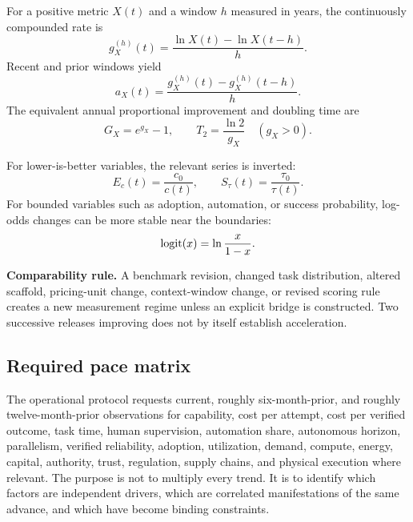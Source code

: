 For a positive metric $X(t)$ and a window $h$ measured in years, the continuously compounded rate is
\begin{equation}
\label{eq:growth}
g_X^{(h)}(t)=\frac{\ln X(t)-\ln X(t-h)}{h}.
\end{equation}
Recent and prior windows yield
\begin{equation}
\label{eq:acceleration}
a_X(t)=\frac{g_X^{(h)}(t)-g_X^{(h)}(t-h)}{h}.
\end{equation}
The equivalent annual proportional improvement and doubling time are
\begin{equation}
G_X=e^{g_X}-1,\qquad T_2=\frac{\ln 2}{g_X}\quad(g_X>0).
\end{equation}

For lower-is-better variables, the relevant series is inverted:
\begin{equation}
E_c(t)=\frac{c_0}{c(t)},\qquad S_\tau(t)=\frac{\tau_0}{\tau(t)}.
\end{equation}
For bounded variables such as adoption, automation, or success probability, log-odds changes can be more stable near the boundaries:
\begin{equation}
\operatorname{logit}(x)=\ln\frac{x}{1-x}.
\end{equation}

\begin{warningbox}
\textbf{Comparability rule.} A benchmark revision, changed task distribution, altered scaffold, pricing-unit change, context-window change, or revised scoring rule creates a new measurement regime unless an explicit bridge is constructed. Two successive releases improving does not by itself establish acceleration.
\end{warningbox}

\subsection{Required pace matrix}

The operational protocol requests current, roughly six-month-prior, and roughly twelve-month-prior observations for capability, cost per attempt, cost per verified outcome, task time, human supervision, automation share, autonomous horizon, parallelism, verified reliability, adoption, utilization, demand, compute, energy, capital, authority, trust, regulation, supply chains, and physical execution where relevant. The purpose is not to multiply every trend. It is to identify which factors are independent drivers, which are correlated manifestations of the same advance, and which have become binding constraints.
